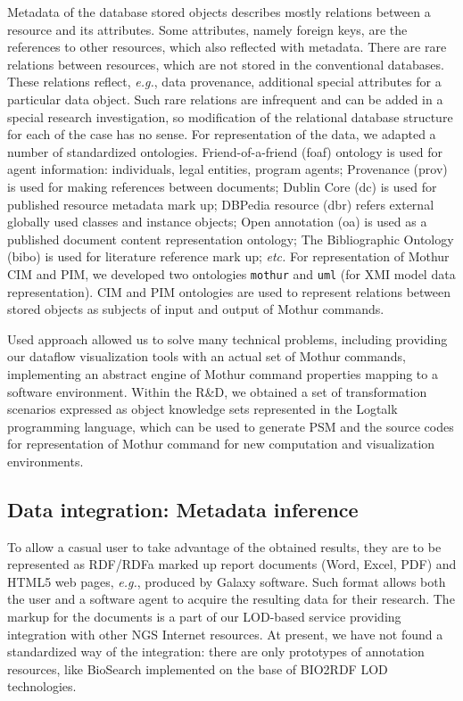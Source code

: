 \documentclass[a4paper]{jpconf}
\begin{document}
Metadata of the database stored objects describes mostly relations between a resource and its attributes.  Some attributes, namely foreign keys, are the references to other resources, which also reflected with metadata.  There are rare relations between resources, which are not stored in the conventional databases.  These relations reflect, \emph{e.g.}, data provenance, additional special attributes for a particular data object.  Such rare relations are infrequent and can be added in a special research investigation, so modification of the relational database structure for each of the case has no sense. For representation of the data, we adapted a number of standardized ontologies. Friend-of-a-friend (foaf) ontology is used for agent information: individuals, legal entities, program agents; Provenance (prov) is used for making references between documents; Dublin Core (dc) is used for published resource metadata mark up; DBPedia resource ({dbr}) refers external globally used classes and instance objects; Open annotation ({oa}) is used as a published document content representation ontology; The Bibliographic Ontology ({bibo}) is used for literature reference mark up; \emph{etc.} For representation of Mothur CIM and PIM, we developed two ontologies \texttt{mothur} and \texttt{uml} (for XMI model data representation).  CIM and PIM ontologies are used to represent relations between stored objects as subjects of input and output of Mothur commands.

Used approach allowed us to solve many technical problems, including providing our dataflow visualization tools with an actual set of Mothur commands, implementing an abstract engine of Mothur command properties mapping to a software environment. Within the R\&D, we obtained a set of transformation scenarios expressed as object knowledge sets represented in the Logtalk \cite{logtalk} programming language, which can be used to generate PSM and the source codes for representation of Mothur command for new computation and visualization environments.

\subsection{Data integration: Metadata inference}

To allow a casual user to take advantage of the obtained results, they are to be represented as RDF/RDFa marked up report documents (Word, Excel, PDF) and HTML5 web pages, \emph{e.g.}, produced by Galaxy software.  Such format allows both the user and a software agent to acquire the resulting data for their research.  The markup for the documents is a part of our LOD-based service providing integration with other NGS Internet resources.  At present, we have not found a standardized way of the integration: there are only prototypes of annotation resources, like BioSearch \cite{biosearch} implemented on the base of BIO2RDF LOD technologies.
\end{document}
